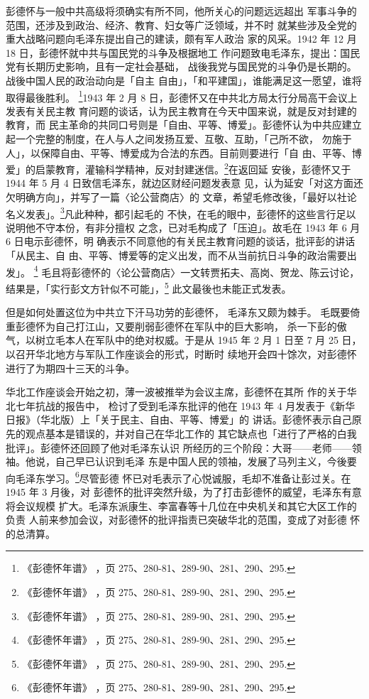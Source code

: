 彭德怀与一般中共高级将须确实有所不同，他所关心的问题远远超出
军事斗争的范围，还涉及到政治、经济、教育、妇女等广泛领域，并不时
就某些涉及全党的重大战略问题向毛泽东提出自己的建读，颇有军人政治
家的风采。1942 年 12 月 18 日，彭德怀就中共与国民党的斗争及根据地工
作问题致电毛泽东，提出：国民党有长期历史影响，且有一定社会基础，
战後我党与国民党的斗争仍是长期的。战後中国人民的政治动向是「自主
自由」，「和平建国」，谁能满足这一愿望，谁将取得最後胜利。
\footnote{《彭德怀年谱》
，页 275、280-81、289-90、281、290、295.}1943
年 2 月 8 日，彭德怀又在中共北方局太行分局高干会议上发表有关民主教
育问题的谈话，认为民主教育在今天中国来说，就是反对封建的教育，而
民主革命的共同口号则是「自由、平等、博爱」。彭德怀认为中共应建立
起一个完整的制度，在人与人之间发扬互爱、互敬、互助，「己所不欲，
勿施于人」，以保障自由、平等、博爱成为合法的东西。目前则要进行「自
由、平等、博爱」的启蒙教育，灌输科学精神，反对封建迷信。\footnote{《彭德怀年谱》
，页 275、280-81、289-90、281、290、295.}在返回延
安後，彭德怀又于 1944 年 5 月 4 日致信毛泽东，就边区财经问题发表意
见，认为延安「对这方面还欠明确方向」，并写了一篇〈论公营商店〉的
文章，希望毛修改後，「最好以社论名义发表」。\footnote{《彭德怀年谱》
，页 275、280-81、289-90、281、290、295.}凡此种种，都引起毛的
不快，在毛的眼中，彭德怀的这些言行足以说明他不守本份，有非分擅权
之念，已对毛构成了「压迫」。故毛在 1943 年 6 月 6 日电示彭德怀，明
确表示不同意他的有关民主教育问题的谈话，批评彭的讲话「从民主、自
由、平等、博爱等的定义出发，而不从当前抗日斗争的政治需要出发」。
\footnote{《彭德怀年谱》
，页 275、280-81、289-90、281、290、295.}
毛且将彭德怀的〈论公营商店〉一文转贾拓夫、高岗、贺龙、陈云讨论，
结果是，「实行彭文方针似不可能」，\footnote{《彭德怀年谱》
，页 275、280-81、289-90、281、290、295.} 此文最後也未能正式发表。

但是如何处置这位为中共立下汗马功劳的彭德怀，
毛泽东又颇为棘手。
毛既要倚重彭德怀为自己打江山，又要削弱彭德怀在军队中的巨大影响，
杀一下彭的傲气，以树立毛本人在军队中的绝对权威。于是从 1945 年 2
月 1 日至 7 月 25 日，以召开华北地方与军队工作座谈会的形式，时断时
续地开会四十馀次，对彭德怀进行了为期四十三天的斗争。

华北工作座谈会开始之初，薄一波被推举为会议主席，彭德怀在其所
作的关于华北七年抗战的报告中，
检讨了受到毛泽东批评的他在 1943 年 4
月发表于《新华日报》（华北版）上「关于民主、自由、平等、博爱」的
讲话。彭德怀表示自己原先的观点基本是错误的，并对自己在华北工作的
其它缺点也「进行了严格的白我批评」。彭德怀还回顾了他对毛泽东认识
所经历的三个阶段：大哥——老师——领袖。他说，自己早已认识到毛泽
东是中国人民的领袖，发展了马列主义，今後要向毛泽东学习。\footnote{《彭德怀年谱》
，页 275、280-81、289-90、281、290、295.}尽管彭德
怀已对毛表示了心悦诚服，毛却不准备让彭过关。在 1945 年 3 月後，对
彭德怀的批评突然升级，为了打击彭德怀的威望，毛泽东有意将会议规模
扩大。毛泽东派康生、李富春等十几位在中央机关和其它大区工作的负责
人前来参加会议，对彭德怀的批评指责已突破华北的范围，变成了对彭德
怀的总清算。

